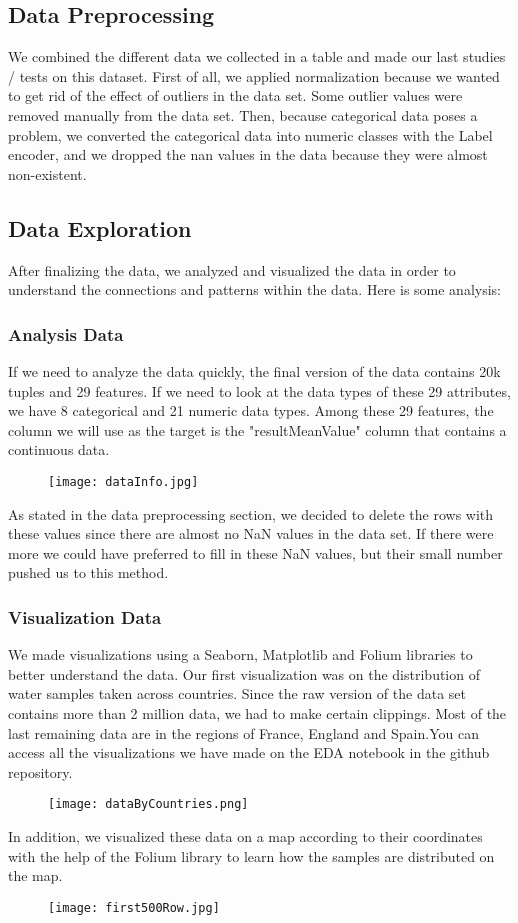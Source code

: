 \documentclass[]{article}
\begin{document}
\subsection{Data Preprocessing}
We combined the different data we collected in a table and made our last studies / tests on this dataset. First of all, we applied normalization because we wanted to get rid of the effect of outliers in the data set. Some outlier values were removed manually from the data set. Then, because categorical data poses a problem, we converted the categorical data into numeric classes with the Label encoder, and we dropped the nan values in the data because they were almost non-existent.
\subsection{Data Exploration}
After finalizing the data, we analyzed and visualized the data in order to understand the connections and patterns within the data. Here is some analysis:
\subsubsection{Analysis Data}
If we need to analyze the data quickly, the final version of the data contains 20k tuples and 29 features. If we need to look at the data types of these 29 attributes, we have 8 categorical and 21 numeric data types. Among these 29 features, the column we will use as the target is the "resultMeanValue" column that contains a continuous data.
\begin{figure}[h]
    \centering
    \texttt{[image: dataInfo.jpg]}
\end{figure}
As stated in the data preprocessing section, we decided to delete the rows with these values since there are almost no NaN values in the data set. If there were more we could have preferred to fill in these NaN values, but their small number pushed us to this method.
\subsubsection{Visualization Data}
We made visualizations using a Seaborn, Matplotlib and Folium libraries to better understand the data. Our first visualization was on the distribution of water samples taken across countries. Since the raw version of the data set contains more than 2 million data, we had to make certain clippings. Most of the last remaining data are in the regions of France, England and Spain.You can access all the visualizations we have made on the EDA notebook in the github repository.
\begin{figure}[h]
    \centering
    \texttt{[image: dataByCountries.png]}
\end{figure}
 In addition, we visualized these data on a map according to their coordinates with the help of the Folium library to learn how the samples are distributed on the map.
\begin{figure}[h]
    \centering
    \texttt{[image: first500Row.jpg]}
\end{figure}
\end{document}
